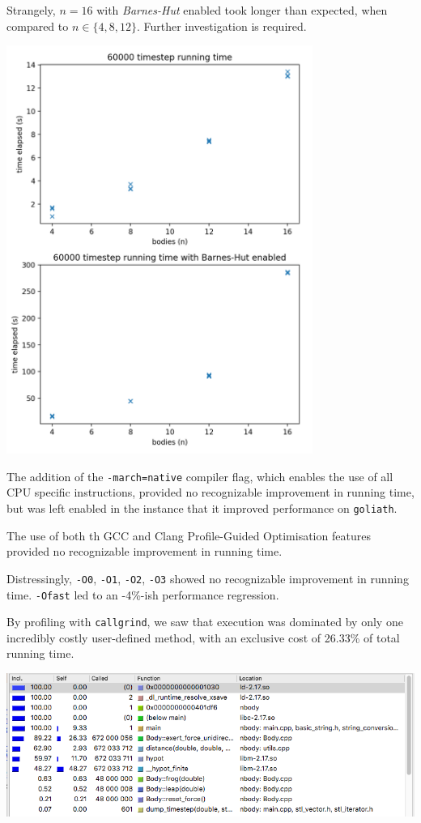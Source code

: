 \documentclass[11pt,a4paper]{article}
\begin{document}
Strangely, $n = 16$ with \textit{Barnes-Hut} enabled took longer than expected, when compared to $n \in \{ 4, 8, 12 \}$. Further investigation is required.

\begin{center}
\includegraphics[width=0.75\textwidth]{performance}
\end{center}

The addition of the 
\texttt{-march=native} compiler flag, which enables the use of all CPU specific instructions, provided no recognizable improvement in running time, but was left enabled in the instance that it improved performance on \texttt{goliath}.

The use of both th GCC and Clang Profile-Guided Optimisation features provided no recognizable improvement in running time.

Distressingly, \texttt{-O0}, \texttt{-O1}, \texttt{-O2}, \texttt{-O3} showed no recognizable improvement in running time. \texttt{-Ofast} led to an -4\%-ish performance regression.

By profiling with \texttt{callgrind}, we saw that execution was dominated by only one incredibly costly user-defined method, with an exclusive cost of 26.33\% of total running time.

\includegraphics[width=\textwidth]{profile}
\end{document}

